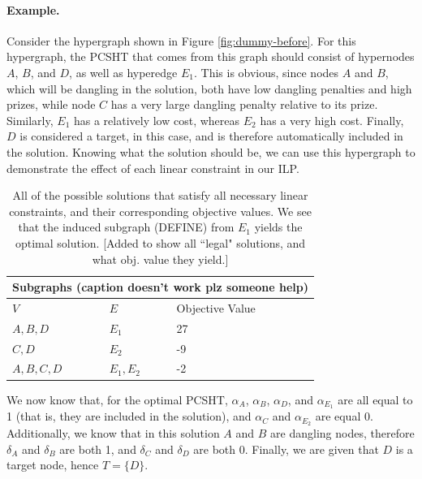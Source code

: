 \documentclass[12pt,twoside]{reedthesis}
\newcommand{\new}[2]{{\color{orange}#1 [#2]}}
\theoremstyle{definition}
\begin{document}
\paragraph{Example.}Consider the hypergraph shown in Figure \ref{fig:dummy-before}. For this hypergraph, the PCSHT that comes from this graph should consist of hypernodes $A$, $B$, and $D$, as well as hyperedge $E_1$. This is obvious, since nodes $A$ and $B$, which will be dangling in the solution, both have low dangling penalties and high prizes, while node $C$ has a very large dangling penalty relative to its prize. Similarly, $E_1$ has a relatively low cost, whereas $E_2$ has a very high cost. Finally, $D$ is considered a target, in this case, and is therefore automatically included in the solution. Knowing what the solution should be, we can use this hypergraph to demonstrate the effect of each linear constraint in our ILP.\par

\begin{table}[!h]
\begin{center}
  \label{tab:obj_values_dummy}
  \caption[Objective values of dummy hypergraph.]{\new{All of the possible solutions that satisfy all necessary linear constraints, and their corresponding objective values. We see that the induced subgraph (DEFINE) from $E_1$ yields the optimal solution.}{Added to show all ``legal" solutions, and what obj. value they yield.}}
\begin{tabular}{ |l|l|l| }%
  \hline%
  \multicolumn{3}{|c|}{Subgraphs (caption doesn't work plz someone help)} \\%
  \hline \hline
  $V$ & $E$ & Objective Value \\ \hline%
  $A,B,D$ & $E_1$ & 27 \\ \hline%
  $C,D$ & $E_2$ & -9 \\ \hline%
  $A,B,C,D$ & $E_1,E_2$ & -2 \\ \hline%
\end{tabular}%
\end{center}
\end{table}



We now know that, for the optimal PCSHT, $\alpha_A$, $\alpha_B$, $\alpha_D$, and $\alpha_{E_1}$ are all equal to 1 (that is, they are included in the solution), and $\alpha_C$ and $\alpha_{E_2}$ are equal 0. Additionally, we know that in this solution $A$ and $B$ are dangling nodes, therefore $\delta_A$ and $\delta_B$ are both 1, and $\delta_C$ and $\delta_D$ are both 0. Finally, we are given that $D$ is a target node, hence $T=\{D\}$.\par
\end{document}
